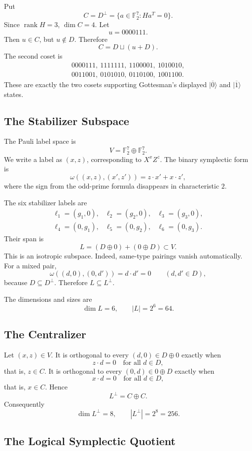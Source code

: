 Put
\[
  C=D^\perp=\{a\in\mathbb F_2^7:Ha^T=0\}.
\]
Since \(\operatorname{rank}H=3\), \(\dim C=4\). Let
\[
  u=0000111 .
\]
Then \(u\in C\), but \(u\notin D\). Therefore
\[
  C=D\sqcup(u+D).
\]
The second coset is
\[
\begin{gathered}
0000111,\ 1111111,\ 1100001,\ 1010010,\\
0011001,\ 0101010,\ 0110100,\ 1001100 .
\end{gathered}
\]
These are exactly the two cosets supporting Gottesman's displayed
\(|\overline 0\rangle\) and \(|\overline 1\rangle\) states.

\subsection{The Stabilizer Subspace}

The Pauli label space is
\[
  V=\mathbb F_2^7\oplus\mathbb F_2^7.
\]
We write a label as \((x,z)\), corresponding to \(X^xZ^z\). The binary
symplectic form is
\[
  \omega((x,z),(x',z'))=z\cdot x'+x\cdot z',
\]
where the sign from the odd-prime formula disappears in characteristic \(2\).

The six stabilizer labels are
\[
\begin{array}{lll}
\ell_1=(g_1,0),& \ell_2=(g_2,0),& \ell_3=(g_3,0),\\
\ell_4=(0,g_1),& \ell_5=(0,g_2),& \ell_6=(0,g_3).
\end{array}
\]
Their span is
\[
  L=(D\oplus0)+(0\oplus D)\subset V.
\]
This is an isotropic subspace. Indeed, same-type pairings vanish automatically.
For a mixed pair,
\[
  \omega((d,0),(0,d'))=d\cdot d'=0
  \qquad(d,d'\in D),
\]
because \(D\subseteq D^\perp\). Therefore \(L\subseteq L^\perp\).

The dimensions and sizes are
\[
  \dim L=6,\qquad |L|=2^6=64.
\]

\subsection{The Centralizer}

Let \((x,z)\in V\). It is orthogonal to every \((d,0)\in D\oplus0\) exactly
when
\[
  z\cdot d=0\quad\text{for all }d\in D,
\]
that is, \(z\in C\). It is orthogonal to every \((0,d)\in0\oplus D\) exactly
when
\[
  x\cdot d=0\quad\text{for all }d\in D,
\]
that is, \(x\in C\). Hence
\[
  L^\perp=C\oplus C.
\]
Consequently
\[
  \dim L^\perp=8,\qquad |L^\perp|=2^8=256.
\]

\subsection{The Logical Symplectic Quotient}

